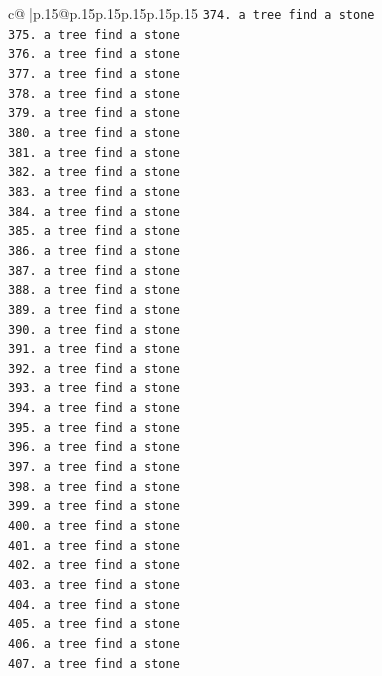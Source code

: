 \documentclass{article}
\begin{document}
{\begin{supertabular}{c@{$\;$}|p{.15\linewidth}@{}p{.15\linewidth}p{.15\linewidth}p{.15\linewidth}p{.15\linewidth}p{.15\linewidth}}
{{{\texttt{374. a tree find a stone} \\
\texttt{375. a tree find a stone} \\
\texttt{376. a tree find a stone} \\
\texttt{377. a tree find a stone} \\
\texttt{378. a tree find a stone} \\
\texttt{379. a tree find a stone} \\
\texttt{380. a tree find a stone} \\
\texttt{381. a tree find a stone} \\
\texttt{382. a tree find a stone} \\
\texttt{383. a tree find a stone} \\
\texttt{384. a tree find a stone} \\
\texttt{385. a tree find a stone} \\
\texttt{386. a tree find a stone} \\
\texttt{387. a tree find a stone} \\
\texttt{388. a tree find a stone} \\
\texttt{389. a tree find a stone} \\
\texttt{390. a tree find a stone} \\
\texttt{391. a tree find a stone} \\
\texttt{392. a tree find a stone} \\
\texttt{393. a tree find a stone} \\
\texttt{394. a tree find a stone} \\
\texttt{395. a tree find a stone} \\
\texttt{396. a tree find a stone} \\
\texttt{397. a tree find a stone} \\
\texttt{398. a tree find a stone} \\
\texttt{399. a tree find a stone} \\
\texttt{400. a tree find a stone} \\
\texttt{401. a tree find a stone} \\
\texttt{402. a tree find a stone} \\
\texttt{403. a tree find a stone} \\
\texttt{404. a tree find a stone} \\
\texttt{405. a tree find a stone} \\
\texttt{406. a tree find a stone} \\
\texttt{407. a tree find a stone} \\
}}}
\end{supertabular}}
\end{document}

